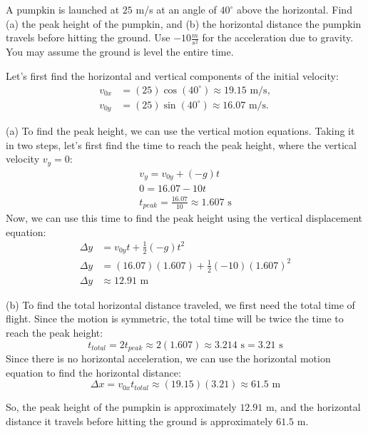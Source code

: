 \begin{Exercise}[title=Projectile Motion at an angle, label=projectiles_angle1]
A pumpkin is launched at $25$ m/s at an angle of $40^\circ$ above the horizontal. Find (a) the peak height of the pumpkin, and (b) the horizontal distance the pumpkin travels before hitting the ground. Use $-10 \frac{m}{s^2}$ for the acceleration due to gravity. You may assume the ground is level the entire time. 
\end{Exercise}
\begin{Answer}[ref=projectiles_angle1]
Let's first find the horizontal and vertical components of the initial velocity:
\begin{align*}
v_{0x} &= (25) \cos(40^\circ) \approx 19.15 \text{ m/s}, \\
v_{0y} &= (25) \sin(40^\circ) \approx 16.07 \text{ m/s}.
\end{align*}

(a) To find the peak height, we can use the vertical motion equations. Taking it in two steps, let's first find the time to reach the peak height, where the vertical velocity $v_y = 0$:
\begin{align*}
    v_y = v_{0y} + (-g) t \\
    0 = 16.07 - 10t \\
    t_{peak} = \frac{16.07}{10} \approx 1.607 \text{ s}
\end{align*}
Now, we can use this time to find the peak height using the vertical displacement equation:
\begin{align*}
    \Delta y &= v_{0y} t + \frac{1}{2} (-g) t^2 \\
    \Delta y &= (16.07)(1.607) + \frac{1}{2} (-10) (1.607)^2 \\
    \Delta y &\approx 12.91 \text{ m}
\end{align*}

(b) To find the total horizontal distance traveled, we first need the total time of flight. Since the motion is symmetric, the total time will be twice the time to reach the peak height:
\[
t_{total} = 2t_{peak} \approx 2(1.607) \approx 3.214 \text{ s} = 3.21 \text{ s}
\]
Since there is no horizontal acceleration, we can use the horizontal motion equation to find the horizontal distance:
\[
\Delta x = v_{0x} t_{total} \approx (19.15)(3.21) \approx 61.5 \text{ m}
\]

So, the peak height of the pumpkin is approximately \(12.91\) m, and the horizontal distance it travels before hitting the ground is approximately \(61.5\) m.
\end{Answer}

